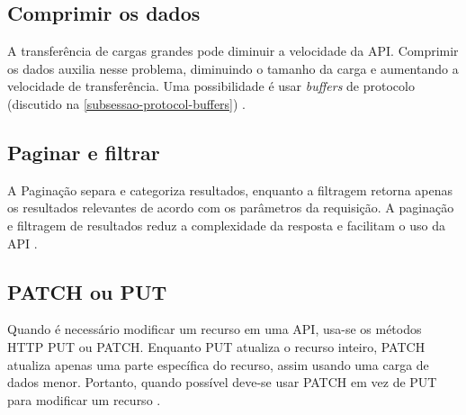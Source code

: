 \subsection{Comprimir os dados}
A transferência de cargas grandes pode diminuir a velocidade da API. Comprimir os dados auxilia nesse problema, diminuindo o tamanho da carga e aumentando a velocidade de transferência. Uma possibilidade é usar \emph{buffers} de protocolo (discutido na \autoref{subsessao-protocol-buffers}) \cite{rapidAPI-twitter}.



\subsection{Paginar e filtrar}
A Paginação separa e categoriza resultados, enquanto a filtragem retorna apenas os resultados relevantes de acordo com os parâmetros da requisição. A paginação e filtragem de resultados reduz a complexidade da resposta e facilitam o uso da API \cite{rapidAPI-twitter}.

\subsection{PATCH ou PUT}
Quando é necessário modificar um recurso em uma API, usa-se os métodos HTTP PUT ou PATCH. Enquanto PUT atualiza o recurso inteiro, PATCH atualiza apenas uma parte específica do recurso, assim usando uma carga de dados menor. Portanto, quando possível deve-se usar PATCH em vez de PUT para modificar um recurso \cite{rapidAPI-twitter}.


